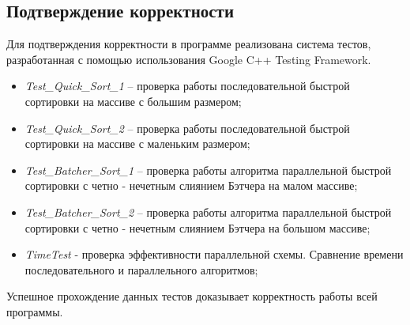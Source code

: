 \documentclass[a4paper]{report}
\begin{document}
\begin{center}
\section*{Подтверждение корректности}
\end{center}
\par Для подтверждения корректности в программе реализована система тестов, разработанная с помощью использования Google C++ Testing Framework.
\begin{itemize}
\item\textit{Test\_Quick\_Sort\_1} – проверка работы последовательной быстрой сортировки на массиве с большим размером;
\item\textit{Test\_Quick\_Sort\_2} – проверка работы последовательной быстрой сортировки на массиве с маленьким размером;
\item\textit{Test\_Batcher\_Sort\_1} – проверка работы алгоритма параллельной быстрой сортировки с четно - нечетным слиянием Бэтчера на малом массиве;
\item\textit{Test\_Batcher\_Sort\_2} – проверка работы алгоритма параллельной быстрой сортировки с четно - нечетным слиянием Бэтчера на большом массиве;
\item\textit{TimeTest} - проверка эффективности параллельной схемы. Сравнение времени последовательного и параллельного алгоритмов;
\end{itemize}
\par Успешное прохождение данных тестов доказывает корректность работы всей программы.
\newpage
\end{document}
